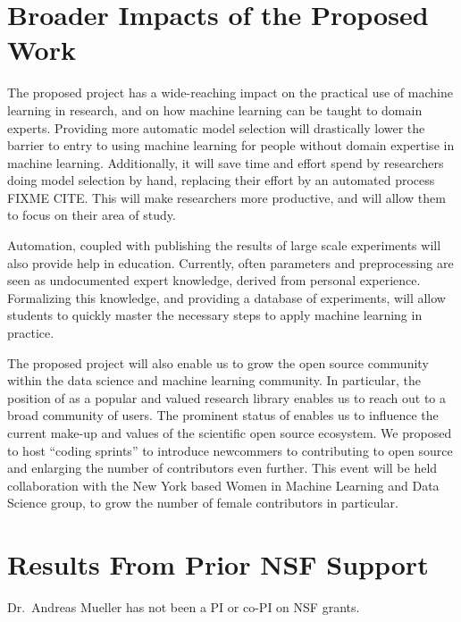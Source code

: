 \section{Broader Impacts of the Proposed Work}
The proposed project has a wide-reaching impact on the practical use of
machine learning in research, and on how machine learning can be taught to
domain experts.
Providing more automatic model selection will drastically lower the barrier
to entry to using machine learning for people without domain expertise
in machine learning.
Additionally, it will save time and effort spend by researchers doing
model selection by hand, replacing their effort by an automated process FIXME CITE\@.
This will make researchers more productive, and will allow them to focus
on their area of study.

Automation, coupled with publishing the results of large scale experiments will
also provide help in education. Currently, often parameters and
preprocessing are seen as undocumented expert knowledge, derived from personal experience.
Formalizing this knowledge, and providing a database of experiments,
will allow students to quickly master the necessary steps to apply
machine learning in practice.

The proposed project will also enable us to grow the open source community
within the data science and machine learning community.
In particular, the position of \sklearn{} as a popular and valued
research library enables us to reach out to a broad community of users.
The prominent status of \sklearn{} enables us to influence
the current make-up and values of the scientific open source ecosystem.
We proposed to host ``coding sprints'' to introduce
newcommers to contributing to open source and enlarging the
number of contributors even further. This event will be held collaboration with
the New York based Women in Machine Learning and Data Science group, to grow
the number of female contributors in particular. 


\section{Results From Prior NSF Support}
Dr.\ Andreas Mueller has not been a PI or co-PI on NSF grants.


